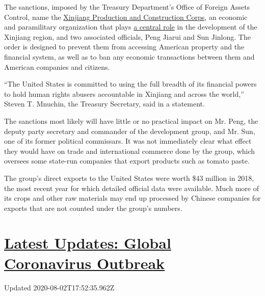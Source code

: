 The sanctions, imposed by the Treasury Department's Office of Foreign
Assets Control, name the
\href{https://www.nytimes.com/2009/08/07/world/asia/07xinjiang.html}{Xinjiang
Production and Construction Corps}, an economic and paramilitary
organization that plays
\href{https://www.andrewerickson.com/2019/11/the-xinjiang-production-construction-corps-key-policy-tool-from-mao-to-xi/}{a
central role} in the development of the Xinjiang region, and two
associated officials, Peng Jiarui and Sun Jinlong. The order is designed
to prevent them from accessing American property and the financial
system, as well as to ban any economic transactions between them and
American companies and citizens.

``The United States is committed to using the full breadth of its
financial powers to hold human rights abusers accountable in Xinjiang
and across the world,'' Steven T. Mnuchin, the Treasury Secretary, said
in a statement.

The sanctions most likely will have little or no practical impact on Mr.
Peng, the deputy party secretary and commander of the development group,
and Mr. Sun, one of its former political commissars. It was not
immediately clear what effect they would have on trade and international
commerce done by the group, which oversees some state-run companies that
export products such as tomato paste.

The group's direct exports to the United States were worth \$43 million
in 2018, the most recent year for which detailed official data were
available. Much more of its crops and other raw materials may end up
processed by Chinese companies for exports that are not counted under
the group's numbers.

\hypertarget{latest-updates-global-coronavirus-outbreak}{%
\section{\texorpdfstring{\href{https://www.nytimes.com/2020/08/01/world/coronavirus-covid-19.html?action=click\&pgtype=Article\&state=default\&region=MAIN_CONTENT_1\&context=storylines_live_updates}{Latest
Updates: Global Coronavirus
Outbreak}}{Latest Updates: Global Coronavirus Outbreak}}\label{latest-updates-global-coronavirus-outbreak}}

Updated 2020-08-02T17:52:35.962Z

